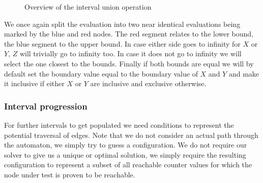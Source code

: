 \documentclass[12pt]{article}
\begin{document}
\begin{figure}
	\caption{Overview of the interval union operation}
	\label{fig:union}
\end{figure}


We once again split the evaluation into two near identical evaluations being marked by the blue and red nodes. The red segment relates to the lower bound, the blue segment to the upper bound. In case either side goes to infinity for $X$ or $Y$, $Z$ will trivially go to infinity too. In case it does not go to infinity we will select the one closest to the bounds. Finally if both bounds are equal we will by default set the boundary value equal to the boundary value of $X$ and $Y$ and make it inclusive if either $X$ or $Y$ are inclusive and exclusive otherwise.

\subsubsection{Interval progression}
For further intervals to get populated we need conditions to represent the potential traversal of edges. Note that we do not consider an actual path through the automaton, we simply try to guess a configuration. We do not require our solver to give us a unique or optimal solution, we simply require the resulting configuration to represent a subset of all reachable counter values for which the node under test is proven to be reachable.
\end{document}
